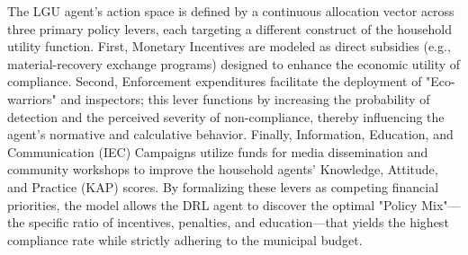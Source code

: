The LGU agent’s action space is defined by a continuous allocation vector across three primary policy levers, each targeting a different construct of the household utility function. First, Monetary Incentives are modeled as direct subsidies (e.g., material-recovery exchange programs) designed to enhance the economic utility of compliance. Second, Enforcement expenditures facilitate the deployment of "Eco-warriors" and inspectors; this lever functions by increasing the probability of detection and the perceived severity of non-compliance, thereby influencing the agent's normative and calculative behavior. Finally, Information, Education, and Communication (IEC) Campaigns utilize funds for media dissemination and community workshops to improve the household agents' Knowledge, Attitude, and Practice (KAP) scores. By formalizing these levers as competing financial priorities, the model allows the DRL agent to discover the optimal "Policy Mix"—the specific ratio of incentives, penalties, and education—that yields the highest compliance rate while strictly adhering to the municipal budget.
